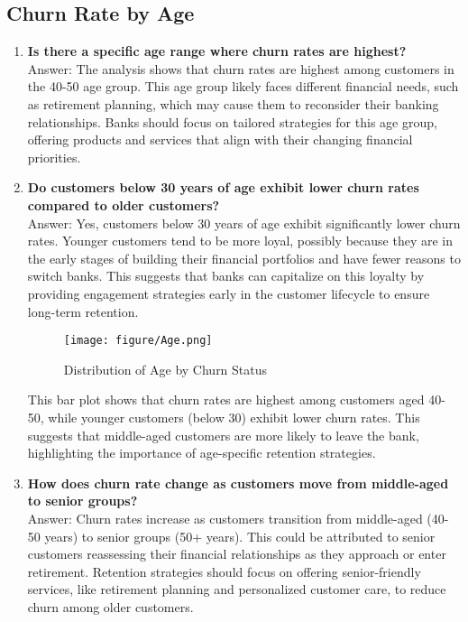 \documentclass[12pt]{article}
\begin{document}
\subsection{Churn Rate by Age} 

\begin{enumerate}
    \item \textbf{Is there a specific age range where churn rates are highest?}\\
    Answer: The analysis shows that churn rates are highest among customers in the 40-50 age group. This age group likely faces different financial needs, such as retirement planning, which may cause them to reconsider their banking relationships. Banks should focus on tailored strategies for this age group, offering products and services that align with their changing financial priorities.

    \item \textbf{ Do customers below 30 years of age exhibit lower churn rates compared to older customers?}\\ 
    Answer: Yes, customers below 30 years of age exhibit significantly lower churn rates. Younger customers tend to be more loyal, possibly because they are in the early stages of building their financial portfolios and have fewer reasons to switch banks. This suggests that banks can capitalize on this loyalty by providing engagement strategies early in the customer lifecycle to ensure long-term retention.

    \begin{figure}[h]
        \centering
        \texttt{[image: figure/Age.png]}  
        \caption{Distribution of Age by Churn Status}
            \label{fig:figure}
       \vspace{0cm}
    \end{figure}
    
    This bar plot shows that churn rates are highest among customers aged 40-50, while younger customers (below 30) exhibit lower churn rates. This suggests that middle-aged customers are more likely to leave the bank, highlighting the importance of age-specific retention strategies.

    
    \item \textbf{ How does churn rate change as customers move from middle-aged to senior groups?}\\ 
    Answer: Churn rates increase as customers transition from middle-aged (40-50 years) to senior groups (50+ years). This could be attributed to senior customers reassessing their financial relationships as they approach or enter retirement. Retention strategies should focus on offering senior-friendly services, like retirement planning and personalized customer care, to reduce churn among older customers.


\end{enumerate}
\end{document}
